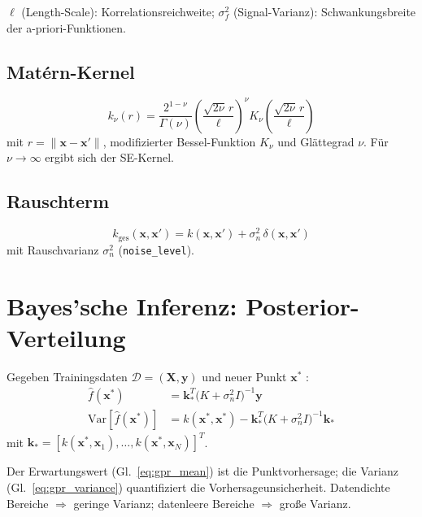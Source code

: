 \documentclass[11pt,a4paper]{report}
\begin{document}
$\ell$ (Length-Scale): Korrelationsreichweite; $\sigma_f^2$ (Signal-Varianz): Schwankungsbreite
der a-priori-Funktionen.

\subsection{Mat\'{e}rn-Kernel}

\begin{equation}
k_{\nu}(r) = \frac{2^{1-\nu}}{\Gamma(\nu)}
\left(\frac{\sqrt{2\nu}\,r}{\ell}\right)^\nu
K_\nu\!\left(\frac{\sqrt{2\nu}\,r}{\ell}\right)
\end{equation}
mit $r = \lVert\mathbf{x}-\mathbf{x}'\rVert$, modifizierter Bessel-Funktion $K_\nu$ und
Gl\"{a}ttegrad $\nu$. F\"{u}r $\nu \to \infty$ ergibt sich der SE-Kernel.

\subsection{Rauschterm}

\begin{equation}
k_{\text{ges}}(\mathbf{x},\mathbf{x}') = k(\mathbf{x},\mathbf{x}') + \sigma_n^2\,\delta(\mathbf{x},\mathbf{x}')
\end{equation}
mit Rauschvarianz $\sigma_n^2$ (\texttt{noise\_level}).

\section{Bayes'sche Inferenz: Posterior-Verteilung}

Gegeben Trainingsdaten $\mathcal{D} = (\mathbf{X}, \mathbf{y})$ und neuer Punkt $\mathbf{x}^*$
\cite{rasmussen2006}:
\begin{align}
\hat{f}(\mathbf{x}^*) &= \mathbf{k}_*^T\bigl(K + \sigma_n^2 I\bigr)^{-1}\mathbf{y}
\label{eq:gpr_mean} \\
\mathrm{Var}\!\left[\hat{f}(\mathbf{x}^*)\right] &= k(\mathbf{x}^*,\mathbf{x}^*)
- \mathbf{k}_*^T\bigl(K + \sigma_n^2 I\bigr)^{-1}\mathbf{k}_*
\label{eq:gpr_variance}
\end{align}
mit $\mathbf{k}_* = [k(\mathbf{x}^*, \mathbf{x}_1), \ldots, k(\mathbf{x}^*, \mathbf{x}_N)]^T$.

Der Erwartungswert (Gl.~\ref{eq:gpr_mean}) ist die Punktvorhersage; die Varianz
(Gl.~\ref{eq:gpr_variance}) quantifiziert die Vorhersageunsicherheit. Datendichte Bereiche
$\Rightarrow$ geringe Varianz; datenleere Bereiche $\Rightarrow$ gro\ss{}e Varianz.
\end{document}
